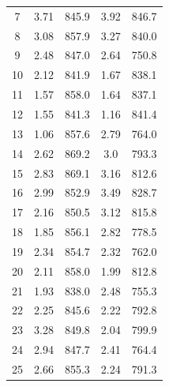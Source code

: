 \documentclass[a4paper, 12pt]{article}
\begin{document}
\begin{enumerate}
\begin{enumerate}
\begin{figure}[h]
\begin{minipage}{0.49\textwidth}
\begin{tabular}{|c|c|c|c|c|}
 					7 & 3.71 & 845.9 & 3.92 & 846.7 \\
 					8 & 3.08 & 857.9 & 3.27 & 840.0 \\
 					9 & 2.48 & 847.0 & 2.64 & 750.8 \\
 					10 & 2.12 & 841.9 & 1.67 & 838.1 \\
 					11 & 1.57 & 858.0 & 1.64 & 837.1 \\
	 				12 & 1.55 & 841.3 & 1.16 & 841.4 \\
 					13 & 1.06 & 857.6 & 2.79 & 764.0 \\
 					14 & 2.62 & 869.2 & 3.0 & 793.3 \\
 					15 & 2.83 & 869.1 & 3.16 & 812.6 \\
 					16 & 2.99 & 852.9 & 3.49 & 828.7 \\
 					17 & 2.16 & 850.5 & 3.12 & 815.8 \\
 					18 & 1.85 & 856.1 & 2.82 & 778.5 \\
 					19 & 2.34 & 854.7 & 2.32 & 762.0 \\
 					20 & 2.11 & 858.0 & 1.99 & 812.8 \\
	 				21 & 1.93 & 838.0 & 2.48 & 755.3 \\
 					22 & 2.25 & 845.6 & 2.22 & 792.8 \\
 					23 & 3.28 & 849.8 & 2.04 & 799.9 \\
	 				24 & 2.94 & 847.7 & 2.41 & 764.4 \\
 					25 & 2.66 & 855.3 & 2.24 & 791.3 \\
					\hline
				\end{tabular}
				\end{minipage}
				\hfil
				\begin{minipage}{0.55\textwidth}
\end{minipage}
\end{figure}
\end{enumerate}
\end{enumerate}
\end{document}
